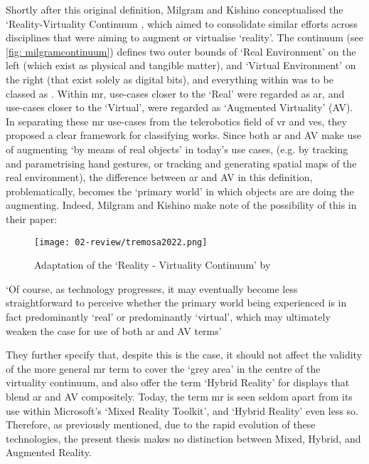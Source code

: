 Shortly after this original definition, Milgram and Kishino conceptualised the `Reality-Virtuality Continuum \citeyearpar{milgram1994}, which aimed to consolidate similar efforts across disciplines that were aiming to augment or virtualise `reality'. The continuum (see \autoref{fig: milgramcontinuum}) defines two outer bounds of `Real Environment' on the left (which exist as physical and tangible matter), and `Virtual Environment' on the right (that exist solely as digital bits), and everything within was to be classed as . Within \gls{mr}, use-cases closer to the `Real' were regarded as \gls{ar}, and use-cases closer to the `Virtual', were regarded as `Augmented Virtuality' (AV). In separating these \gls{mr} use-cases from the telerobotics field of \gls{vr} and \glspl{ve}, they proposed a clear framework for classifying works. Since both \gls{ar} and AV make use of augmenting `by means of real objects' in today's use cases, (e.g. by tracking and parametrising hand gestures, or tracking and generating spatial maps of the real environment), the difference between \gls{ar} and AV in this definition, problematically, becomes the `primary world' in which objects are are doing the augmenting. Indeed, Milgram and Kishino make note of the possibility of this in their paper: 

\begin{figure}[ht]
    \centering
    \texttt{[image: 02-review/tremosa2022.png]}
    \captionsetup{justification=centering,margin=1.5cm}
    \caption{Adaptation of the `Reality - Virtuality Continuum' by \citeauthor{milgram1994} \citep[in][]{tremosa2022}}\label{fig: milgramcontinuum}
\end{figure}

`Of course, as technology progresses, it may eventually become less straightforward to perceive whether the primary world being experienced is in fact predominantly `real' or predominantly `virtual', which may ultimately weaken the case for use of both \gls{ar} and AV terms'

They further specify that, despite this is the case, it should not affect the validity of the more general \gls{mr} term to cover the `grey area' in the centre of the virtuality continuum, and also offer the term `Hybrid Reality' for displays that blend \gls{ar} and AV compositely. Today, the term \gls{mr} is seen seldom apart from its use within Microsoft's `Mixed Reality Toolkit', and `Hybrid Reality' even less so. Therefore, as previously mentioned, due to the rapid evolution of these technologies, the present thesis makes no distinction between Mixed, Hybrid, and Augmented Reality.

